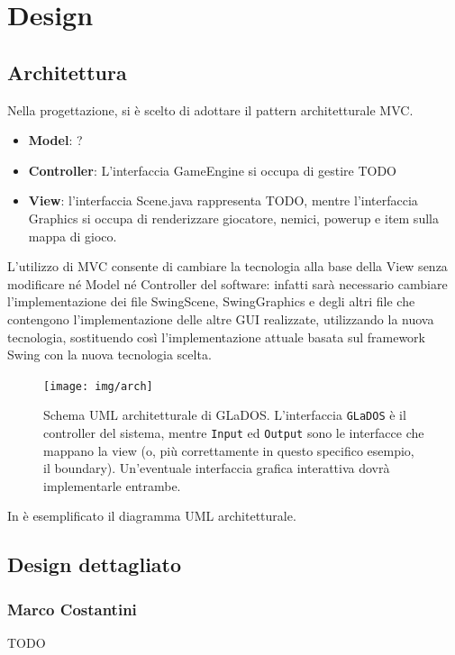\documentclass[a4paper,12pt]{report}
\begin{document}
\chapter{Design}
\section{Architettura}
Nella progettazione, si è scelto di adottare il pattern architetturale MVC.
\begin{itemize}
    \item \textbf{Model}: ?
    \item \textbf{Controller}: L'interfaccia GameEngine si occupa di gestire {TODO}
    \item \textbf{View}: l'interfaccia Scene.java rappresenta {TODO},
        mentre l'interfaccia Graphics si occupa di renderizzare giocatore, nemici, powerup e item sulla mappa di gioco.
\end{itemize}

L'utilizzo di MVC consente di cambiare la tecnologia alla base della View senza modificare
né Model né Controller del software:
infatti sarà necessario cambiare l'implementazione dei file SwingScene, SwingGraphics e degli altri file
che contengono l'implementazione delle altre GUI realizzate, utilizzando la nuova tecnologia,
sostituendo così l'implementazione attuale basata sul framework Swing con la nuova tecnologia scelta.


\begin{figure}[h]
    \centering{}
    \texttt{[image: img/arch]}
    \caption{Schema UML architetturale di GLaDOS. L'interfaccia \texttt{GLaDOS} è il controller del sistema, mentre \texttt{Input} ed \texttt{Output} sono le interfacce che mappano la view (o, più correttamente in questo specifico esempio, il boundary). Un'eventuale interfaccia grafica interattiva dovrà implementarle entrambe.}
    \label{img:goodarch}
\end{figure}


In  è esemplificato il diagramma UML architetturale.


\section{Design dettagliato}

\subsection*{Marco Costantini}
{TODO}
\end{document}
